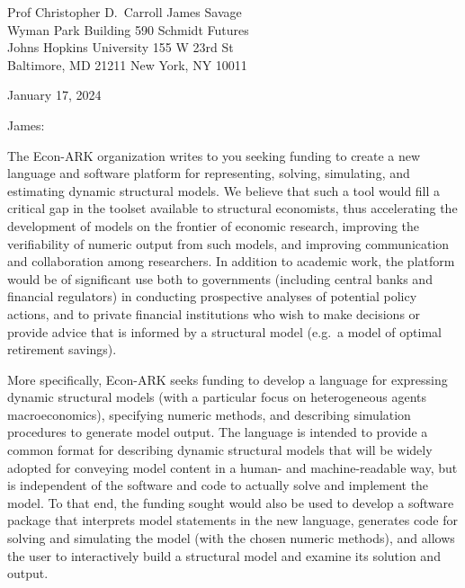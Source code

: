 \documentclass[11pt,pdftex,letterpaper]{article}
\begin{document}
	
\begin{singlespace}
	Prof Christopher D.\ Carroll \hfill James Savage\\
	Wyman Park Building 590 \hfill Schmidt Futures\\
	Johns Hopkins University \hfill 155 W 23rd St\\
	Baltimore, MD 21211 \hfill New York, NY 10011
	
	\vspace{0.2cm}
	
	January 17, 2024
	
\end{singlespace}

\vspace{0.3cm}

James:

The Econ-ARK organization writes to you seeking funding to create a new language and software platform for representing, solving, simulating, and estimating dynamic structural models. We believe that such a tool would fill a critical gap in the toolset available to structural economists, thus accelerating the development of models on the frontier of economic research, improving the verifiability of numeric output from such models, and improving communication and collaboration among researchers. In addition to academic work, the platform would be of significant use both to governments (including central banks and financial regulators) in conducting prospective analyses of potential policy actions, and to private financial institutions who wish to make decisions or provide advice that is informed by a structural model (e.g.\ a model of optimal retirement savings).

More specifically, Econ-ARK seeks funding to develop a language for expressing dynamic structural models (with a particular focus on heterogeneous agents macroeconomics), specifying numeric methods, and describing simulation procedures to generate model output. The language is intended to provide a common format for describing dynamic structural models that will be widely adopted for conveying model content in a human- and machine-readable way, but is independent of the software and code to actually solve and implement the model. To that end, the funding sought would also be used to develop a software package that interprets model statements in the new language, generates code for solving and simulating the model (with the chosen numeric methods), and allows the user to interactively build a structural model and examine its solution and output.
\end{document}

